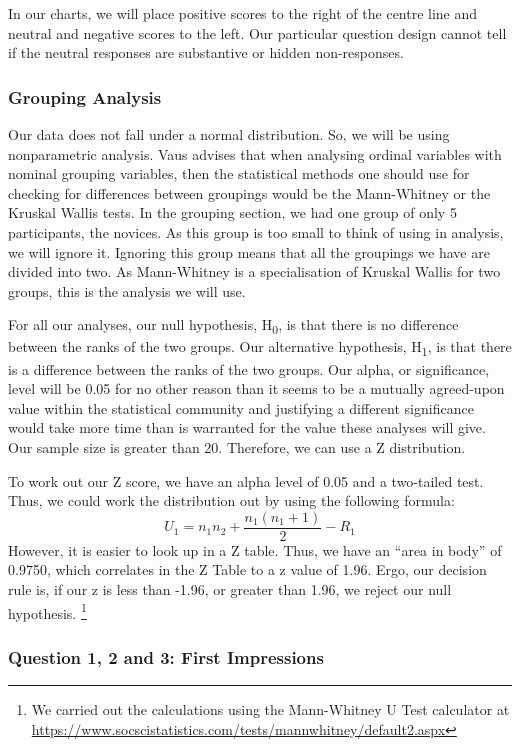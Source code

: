 In our charts, we will place positive scores to the right of the centre line and neutral and negative scores to the left.
Our particular question design cannot tell if the neutral responses are substantive or hidden non-responses\cite{blasius2001use}.

\subsubsection{Grouping Analysis}
Our data does not fall under a normal distribution. 
So, we will be using nonparametric analysis.
Vaus\cite{de2013surveys} advises that when analysing ordinal variables with nominal grouping variables, then the statistical methods one should use for checking for differences between groupings would be the Mann-Whitney\cite{mann1947test} or the Kruskal Wallis\cite{kruskal1952use} tests.
In the grouping section, we had one group of only 5 participants, the novices.
As this group is too small to think of using in analysis, we will ignore it.
Ignoring this group means that all the groupings we have are divided into two.
As Mann-Whitney is a specialisation of Kruskal Wallis for two groups, this is the analysis we will use.

For all our analyses, our null hypothesis, H\textsubscript{0}, is that there is no difference between the ranks of the two groups. 
Our alternative hypothesis, H\textsubscript{1}, is that there is a difference between the ranks of the two groups.
Our alpha, or significance, level will be 0.05 for no other reason than it seems to be a mutually agreed-upon value within the statistical community and justifying a different significance would take more time than is warranted for the value these analyses will give.
Our sample size is greater than 20. 
Therefore, we can use a Z distribution.

To work out our Z score, we have an alpha level of 0.05 and a two-tailed test.
Thus, we could work the distribution out by using the following formula:
\[U_{1}=n_{1}n_{2}+\frac{n_{1}(n_{1}+1)}{2}-R_{1}\]
However, it is easier to look up in a Z table.
Thus, we have an ``area in body'' of 0.9750, which correlates in the Z Table to a z value of 1.96.
Ergo, our decision rule is, if our z is less than -1.96, or greater than 1.96, we reject our null hypothesis.
\footnote{We carried out the calculations using the Mann-Whitney U Test calculator at \url{https://www.socscistatistics.com/tests/mannwhitney/default2.aspx}}

\subsubsection{Question 1, 2 and 3: First Impressions}

